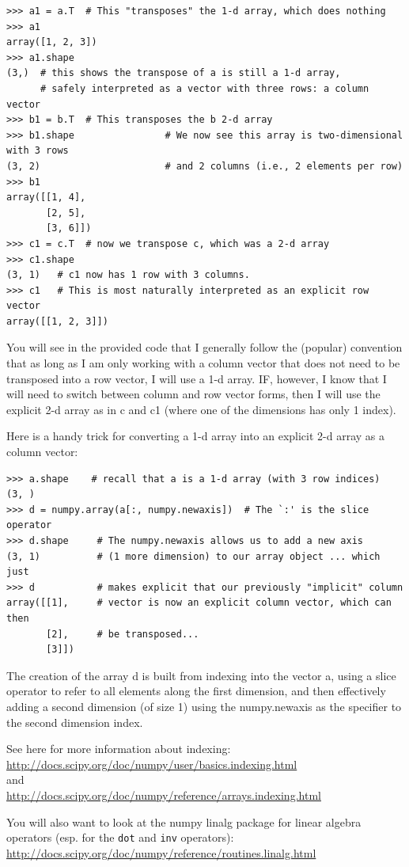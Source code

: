 \documentclass[10pt]{article}
\begin{document}
\begin{verbatim}
>>> a1 = a.T  # This "transposes" the 1-d array, which does nothing
>>> a1
array([1, 2, 3]) 
>>> a1.shape
(3,)  # this shows the transpose of a is still a 1-d array,
      # safely interpreted as a vector with three rows: a column vector
>>> b1 = b.T  # This transposes the b 2-d array
>>> b1.shape                # We now see this array is two-dimensional with 3 rows 
(3, 2)                      # and 2 columns (i.e., 2 elements per row)
>>> b1
array([[1, 4],
       [2, 5],
       [3, 6]])
>>> c1 = c.T  # now we transpose c, which was a 2-d array
>>> c1.shape
(3, 1)   # c1 now has 1 row with 3 columns.
>>> c1   # This is most naturally interpreted as an explicit row vector
array([[1, 2, 3]])
\end{verbatim}
You will see in the provided code that I generally follow the (popular) convention that as long as I am only working with a column vector that does not need to be transposed into a row vector, I will use a 1-d array.  IF, however, I know that I will need to switch between column and row vector forms, then I will use the explicit 2-d array as in c and c1 (where one of the dimensions has only 1 index).

Here is a handy trick for converting a 1-d array into an explicit 2-d array as a column vector:
\begin{verbatim}
>>> a.shape    # recall that a is a 1-d array (with 3 row indices)
(3, )
>>> d = numpy.array(a[:, numpy.newaxis])  # The `:' is the slice operator
>>> d.shape     # The numpy.newaxis allows us to add a new axis 
(3, 1)          # (1 more dimension) to our array object ... which just 
>>> d           # makes explicit that our previously "implicit" column 
array([[1],     # vector is now an explicit column vector, which can then
       [2],     # be transposed...
       [3]])
\end{verbatim}
The creation of the array d is built from indexing into the vector a, using a slice operator to refer to all elements along the first dimension, and then effectively adding a second dimension (of size 1) using the numpy.newaxis as the specifier to the second dimension index.

See here for more information about indexing: \\
\url{http://docs.scipy.org/doc/numpy/user/basics.indexing.html}\\
and\\
\url{http://docs.scipy.org/doc/numpy/reference/arrays.indexing.html}

You will also want to look at the numpy linalg package for linear algebra operators (esp. for the {\tt dot} and {\tt inv} operators):\\
\url{http://docs.scipy.org/doc/numpy/reference/routines.linalg.html}
\end{document}
